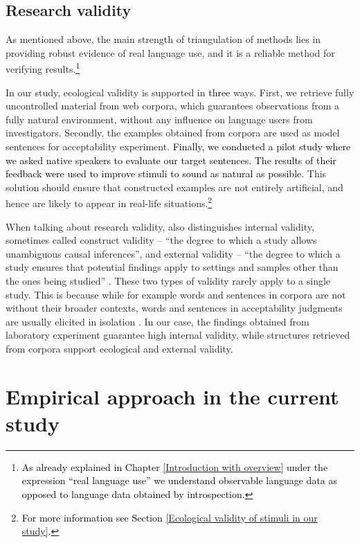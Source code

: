 \subsection{Research validity}
\label{Research validity}
As mentioned above, the main strength of triangulation of methods lies in providing robust evidence of real language use, and it is a reliable method for verifying results.\footnote{\textcolor{black}{As already explained in Chapter \ref{Introduction with overview} under the expression ``real language use'' we understand observable language data as opposed to language data obtained by introspection.}}

In our study, ecological validity is supported in \textcolor{black}{three} ways. First, we retrieve fully uncontrolled material from web corpora, which guarantees observations from a fully natural environment, without any influence on language users from investigators. Secondly, the examples obtained from corpora are used as model sentences for acceptability experiment. \textcolor{black}{Finally, we conducted a pilot study where we asked native speakers to evaluate our target sentences. The results of their feedback were used to improve stimuli to sound as natural as possible.} This solution should ensure that constructed examples are not entirely artificial, and hence are likely to appear in real-life situations.\footnote{\textcolor{black}{For more information see Section \ref{Ecological validity of stimuli in our study}.}}

When talking about research validity, \citet{Brewer00} also distinguishes internal validity, sometimes called construct validity – ``the degree to which a study allows unambiguous causal inferences'', and external validity – ``the degree to which a study ensures that potential findings apply to settings and samples other than the ones being studied'' \citep{Brewer00}. These two types of validity rarely apply to a single study. This is because while for example words and sentences in corpora are not without their broader contexts, words and sentences in acceptability judgments are usually elicited in isolation \citep[3]{Myers17}. In our case, the findings obtained from laboratory experiment guarantee high internal validity, while structures retrieved from corpora support ecological and external validity.

\section{Empirical approach in the current study}
\label{Empirical approach in the current study}
